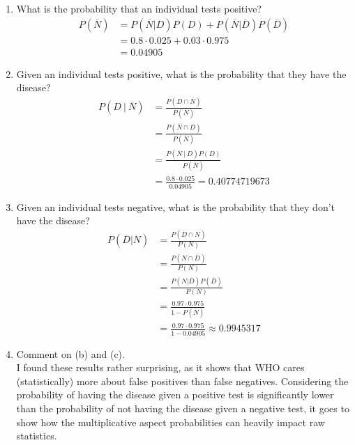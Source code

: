 \documentclass{article}
\begin{document}
\begin{enumerate}[label=\alph*)]
    \item What is the probability that an individual tests positive?
          \begin{align*}
              P(\overline{N}) & = P(\overline{N} | D)P(D) + P(\overline{N} | \overline{D})P(\overline{D}) \\
                              & = 0.8 \cdot 0.025 + 0.03 \cdot 0.975                                      \\
                              & = 0.04905
          \end{align*}
    \item Given an individual tests positive, what is the probability that they have the disease?
          \begin{align*}
              P(D\ \vert\ \overline{N}) & = \frac{P(D \cap \overline{N})}{P(\overline{N})}         \\
                                        & = \frac{P(\overline{N} \cap D)}{P(\overline{N})}         \\
                                        & = \frac{P(\overline{N}\ \vert\ D) P(D)}{P(\overline{N})} \\
                                        & = \frac{0.8 \cdot 0.025}{0.04905} = 0.40774719673
          \end{align*}
    \item Given an individual tests negative, what is the probability that they don't have the disease?
          \begin{align*}
              P(\overline{D} \vert N) & = \frac{P(\overline{D} \cap N)}{P(N)}                    \\
                                      & = \frac{P(N \cap \overline{D})}{P(N)}                    \\
                                      & = \frac{P(N \vert \overline{D}) P(\overline{D})}{P(N)}   \\
                                      & = \frac{0.97 \cdot 0.975}{1 - P(\overline{N})}           \\
                                      & = \frac{0.97 \cdot 0.975}{1 - 0.04905} \approx 0.9945317
          \end{align*}
    \item Comment on (b) and (c). \\
          I found these results rather surprising, as it shows that WHO cares (statistically) more about false positives than false negatives. Considering the probability of having the disease given a positive test is significantly lower than the probability of not having the disease given a negative test, it goes to show how the multiplicative aspect probabilities can heavily impact raw statistics.
\end{enumerate}
\end{document}
